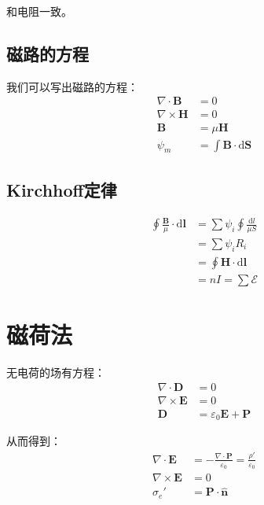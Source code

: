 \documentclass[12pt,onecolumn,a4paper]{book}
\numberwithin{table}{subsection}
\numberwithin{equation}{subsection}
\begin{document}
    和电阻一致。

    \subsection{磁路的方程}

    我们可以写出磁路的方程：
    \begin{align}
        \nabla \cdot \mathbf{B}  & = 0                                           \\
        \nabla \times \mathbf{H} & = 0                                           \\
        \mathbf{B}               & = \mu \mathbf{H}                              \\
        \psi_m                   & = \int \mathbf{B} \cdot \mathrm{d} \mathbf{S}
    \end{align}

    \subsection{Kirchhoff定律}

    \begin{align}
        \oint \frac{\mathbf{B}}{\mu} \cdot \mathrm{d} \mathbf{l} & = \sum \psi_i \oint \frac{ \mathrm{d} l}{\mu S} \\
                                                                 & = \sum \psi_iR_i                                \\
                                                                 & =\oint \mathbf{H} \cdot \mathrm{d} \mathbf{l}   \\
                                                                 & = nI = \sum \mathcal{E}
    \end{align}

    \section{磁荷法}

    无电荷的场有方程：
    \begin{align}
        \nabla \cdot \mathbf{D}  & = 0                                     \\
        \nabla \times \mathbf{E} & = 0                                     \\
        \mathbf{D}               & = \varepsilon_0 \mathbf{E} + \mathbf{P}
    \end{align}

    从而得到：
    \begin{align}
        \nabla \cdot \mathbf{E}  & = - \frac{\nabla \cdot  \mathbf{P}}{\varepsilon_0} = \frac{\rho'}{\varepsilon_0} \\
        \nabla \times \mathbf{E} & = 0                                                                              \\
        \sigma_e'                & = \mathbf{P} \cdot \hat{\mathbf{n}}
    \end{align}
\end{document}
